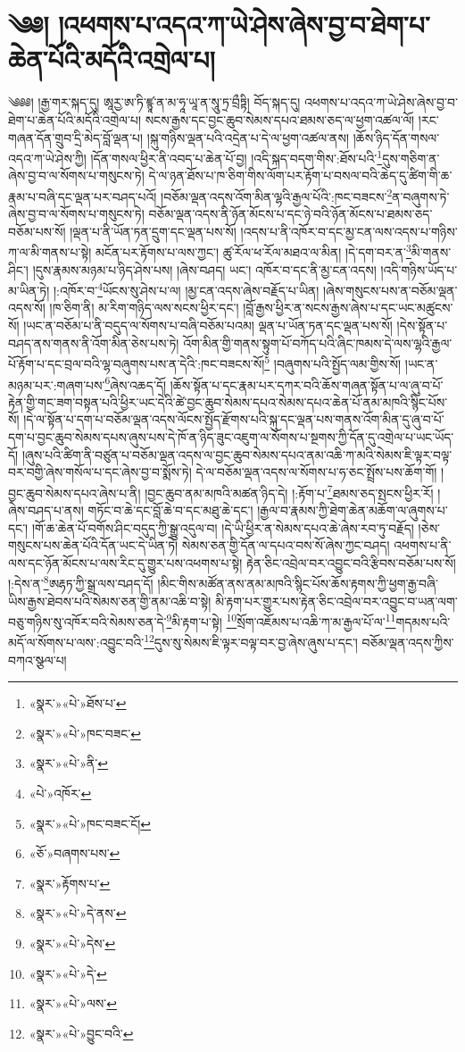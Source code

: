 \chapter{༄༅། །འཕགས་པ་འདའ་ཀ་ཡེ་ཤེས་ཞེས་བྱ་བ་ཐེག་པ་ཆེན་པོའི་མདོའི་འགྲེལ་པ།}༄༅༅། །རྒྱ་གར་སྐད་དུ། ཨཱརྱ་ཨ་ཏི་ཛྙཱ་ན་མ་ཧཱ་ཡཱ་ན་སཱུ་ཏྲ་བྲྀཏྟི། བོད་སྐད་དུ། འཕགས་པ་འདའ་ཀ་ཡེ་ཤེས་ཞེས་བྱ་བ་ཐེག་པ་ཆེན་པོའི་མདོའི་འགྲེལ་པ། སངས་རྒྱས་དང་བྱང་ཆུབ་སེམས་དཔའ་ཐམས་ཅད་ལ་ཕྱག་འཚལ་ལོ། །རང་གཞན་དོན་གྲུབ་དྲི་མེད་བློ་ལྡན་པ། །སྐུ་གཉིས་ལྡན་པའི་འདྲེན་པ་དེ་ལ་ཕྱག་འཚལ་ནས། །ཆོས་ཉིད་དོན་གསལ་འདའ་ཀ་ཡེ་ཤེས་ཀྱི། །དོན་གསལ་ཕྱིར་ནི་འབད་པ་ཆེན་པོ་བྱ། །འདི་སྐད་བདག་གིས་:ཐོས་པའི་\footnote{«སྣར་»«པེ་»ཐོས་པ་}དུས་གཅིག་ན་ཞེས་བྱ་བ་ལ་སོགས་པ་གསུངས་ཏེ། དེ་ལ་ཉན་ཐོས་པ་ཁ་ཅིག་གིས་ལོག་པར་རྟོག་པ་བསལ་བའི་ཆེད་དུ་ཚིག་གི་ཆ་རྣམ་པ་བཞི་དང་ལྡན་པར་བཤད་པའོ། །བཅོམ་ལྡན་འདས་འོག་མིན་ལྷའི་རྒྱལ་པོའི་:ཁང་བཟངས་\footnote{«སྣར་»«པེ་»ཁང་བཟང་}ན་བཞུགས་ཏེ་ཞེས་བྱ་བ་ལ་སོགས་པ་གསུངས་ཏེ། བཅོམ་ལྡན་འདས་ནི་ཉོན་མོངས་པ་དང་ཉེ་བའི་ཉོན་མོངས་པ་ཐམས་ཅད་བཅོམ་པས་སོ། །ལྡན་པ་ནི་ཡོན་ཏན་དྲུག་དང་ལྡན་པས་སོ། །འདས་པ་ནི་འཁོར་བ་དང་མྱ་ངན་ལས་འདས་པ་གཉིས་ཀ་ལ་མི་གནས་པ་སྟེ། མངོན་པར་རྟོགས་པ་ལས་ཀྱང་། ཚུ་རོལ་ཕ་རོལ་མཐའ་ལ་མིན། །དེ་དག་བར་ན་\footnote{«སྣར་»«པེ་»ནི་}མི་གནས་ཤིང་། །དུས་རྣམས་མཉམ་པ་ཉིད་ཤེས་པས། །ཞེས་བཤད། ཡང་། འཁོར་བ་དང་ནི་མྱ་ངན་འདས། །འདི་གཉིས་ཡོད་པ་མ་ཡིན་ཏེ། །:འཁོར་བ་\footnote{«པེ་»འཁོར་}ཡོངས་སུ་ཤེས་པ་ལ། །མྱ་ངན་འདས་ཞེས་བརྗོད་པ་ཡིན། །ཞེས་གསུངས་པས་ན་བཅོམ་ལྡན་འདས་སོ། །ཁ་ཅིག་ནི། མ་རིག་གཉིད་ལས་སངས་ཕྱིར་དང་། །བློ་རྒྱས་ཕྱིར་ན་སངས་རྒྱས་ཞེས་པ་དང་ཡང་མཚུངས་སོ། །ཡང་ན་བཅོམ་པ་ནི་བདུད་ལ་སོགས་པ་བཞི་བཅོམ་པའམ། ལྡན་པ་ཡོན་ཏན་དང་ལྡན་པས་སོ། །དེས་སྟོན་པ་བཤད་ནས་གནས་ནི་འོག་མིན་ཅེས་པས་ཏེ། འོག་མིན་གྱི་གནས་སྟུག་པོ་བཀོད་པའི་ཞིང་ཁམས་དེ་ལས་ལྷའི་རྒྱལ་པོ་རྟོག་པ་དང་བྲལ་བའི་ལྷ་བཞུགས་པས་ན་དེའི་:ཁང་བཟངས་སོ།\footnote{«སྣར་»«པེ་»ཁང་བཟང་ངོ།} །བཞུགས་པའི་སྤྱོད་ལམ་གྱིས་སོ། །ཡང་ན་མཉམ་པར་:གཞག་པས་\footnote{«ཅོ་»བཞགས་པས་}ཞེས་འཆད་དོ། །ཆོས་སྟོན་པ་དང་རྣམ་པར་དཀར་བའི་ཆོས་གཞན་སྟོན་པ་ལ་ཞུ་བ་པོ་རྟེན་གྱི་གང་ཟག་བསྟན་པའི་ཕྱིར་ཡང་དེའི་ཚེ་བྱང་ཆུབ་སེམས་དཔའ་སེམས་དཔའ་ཆེན་པོ་ནམ་མཁའི་སྙིང་པོས་སོ། །དེ་ལ་སྟོན་པ་དག་པ་བཅོམ་ལྡན་འདས་ལོངས་སྤྱོད་རྫོགས་པའི་སྐུ་དང་ལྡན་པས་གནས་འོག་མིན་དུ་ཞུ་བ་པོ་དག་པ་བྱང་ཆུབ་སེམས་དཔས་ཞུས་པས་དེ་ཁོ་ན་ཉིད་ཟུང་འཇུག་ལ་སོགས་པ་སྔགས་ཀྱི་དོན་དུ་འགྲེལ་པ་ཡང་ཡོད་དོ། །ཞུས་པའི་ཚིག་ནི་བཙུན་པ་བཅོམ་ལྡན་འདས་ལ་བྱང་ཆུབ་སེམས་དཔའ་ནམ་འཆི་ཀ་མའི་སེམས་ཇི་ལྟར་བལྟ་བར་བགྱི་ཞེས་གསོལ་པ་དང་ཞེས་བྱ་བ་སྨོས་ཏེ། དེ་ལ་བཅོམ་ལྡན་འདས་ལ་སོགས་པ་ཧ་ཅང་སྤྲོས་པས་ཆོག་གོ། །བྱང་ཆུབ་སེམས་དཔའ་ཞེས་པ་ནི། །བྱང་ཆུབ་ནམ་མཁའི་མཚན་ཉིད་དེ། །:རྟོག་པ་\footnote{«སྣར་»རྟོགས་པ་}ཐམས་ཅད་སྤངས་ཕྱིར་རོ། །ཞེས་བཤད་པ་ནས། གཏོང་བ་ཆེ་དང་བློ་ཆེ་བ་དང་མཐུ་ཆེ་དང་། །རྒྱལ་བ་རྣམས་ཀྱི་ཐེག་ཆེན་མཆོག་ལ་ཞུགས་པ་དང་། །གོ་ཆ་ཆེན་པོ་བགོས་ཤིང་བདུད་ཀྱི་སྒྱུ་འདུལ་བ། །དེ་ཡི་ཕྱིར་ན་སེམས་དཔའ་ཆེ་ཞེས་རབ་ཏུ་བརྗོད། །ཅེས་གསུངས་པས་ཆེན་པོའི་དོན་ཡང་དེ་ཡིན་ཏེ། སེམས་ཅན་གྱི་དོན་ལ་དཔའ་བས་སོ་ཞེས་ཀྱང་བཤད། འཕགས་པ་ནི་ལས་དང་ཉོན་མོངས་པ་ལས་རིང་དུ་གྱུར་པས་འཕགས་པ་སྟེ། རྟེན་ཅིང་འབྲེལ་བར་འབྱུང་བའི་རྩིབས་བཅོམ་པས་སོ། །:དེས་ན་\footnote{«སྣར་»«པེ་»དེ་ནས་}ཨརྷཏ་ཀྱི་སྒྲ་ལས་བཤད་དོ། །མིང་གིས་མཚོན་ནས་ནམ་མཁའི་སྙིང་པོས་ཆོས་རྟགས་ཀྱི་ཕྱག་རྒྱ་བཞི་ཡིས་རྒྱས་ཐེབས་པའི་སེམས་ཅན་གྱི་ནམ་འཆི་བ་སྟེ། མི་རྟག་པར་གྱུར་པས་རྟེན་ཅིང་འབྲེལ་བར་འབྱུང་བ་ཡན་ལག་བཅུ་གཉིས་སུ་འཁོར་བའི་སེམས་ཅན་དེ་\footnote{«སྣར་»«པེ་»དེས་}མི་རྟག་པ་སྟེ། \footnote{«སྣར་»«པེ་»དེ་}སྲོག་འཇོམས་པ་འཆི་ཀ་མ་རྒྱལ་པོ་ལ་\footnote{«སྣར་»«པེ་»ལས་}གདམས་པའི་མདོ་ལ་སོགས་པ་ལས་:འབྱུང་བའི་\footnote{«སྣར་»«པེ་»བྱུང་བའི་}དུས་སུ་སེམས་ཇི་ལྟར་བལྟ་བར་བྱ་ཞེས་ཞུས་པ་དང་། བཅོམ་ལྡན་འདས་ཀྱིས་བཀའ་སྩལ་པ། 
